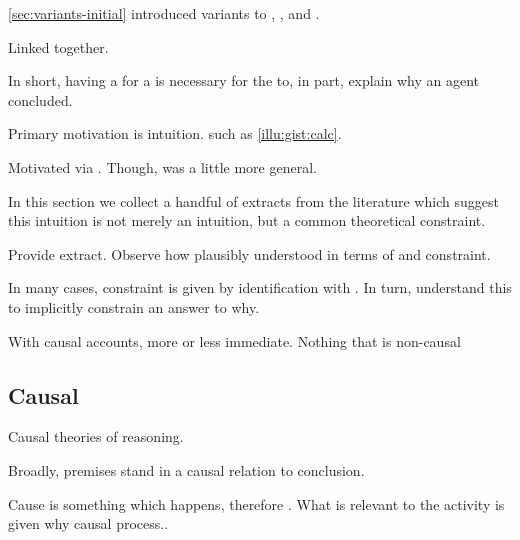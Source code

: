 \begin{note}
  \autoref{sec:variants-initial} introduced variants to \qWhy{}, \qHow{}, and \issueInclusion{}.

  Linked together.

  In short, having a  for a \ros{} is necessary for the \ros{} to, in part, explain why an agent concluded.

  Primary motivation is intuition.
   such as \autoref{illu:gist:calc}.

  Motivated via \citeauthor{Davidson:1963aa}.
  Though, \citeauthor{Davidson:1963aa} was a little more general.

  In this section we collect a handful of extracts from the literature which suggest this intuition is not merely an intuition, but a common theoretical constraint.

  Provide extract.
  Observe how plausibly understood in terms of \wit{} and constraint.

  In many cases, constraint is given by identification with \wit{}.
  In turn, understand this to implicitly constrain an answer to why.

  With causal accounts, more or less immediate.
  Nothing that is non-causal
\end{note}


\subsection{Causal}
\label{cha:clar:sec:literature:causal}

\begin{note}
  Causal theories of reasoning.

  Broadly, premises stand in a causal relation to conclusion.

  Cause is something which happens, therefore \wit{}.
  What is relevant to the activity is given why causal process..
\end{note}

\subsubsection{\textcite{Armstrong:1968vh}}

